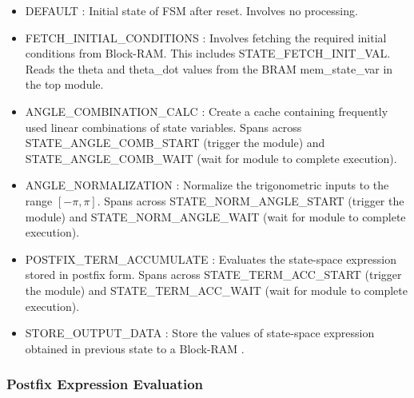 
\begin{itemize}
\item DEFAULT : Initial state of FSM after reset. Involves no processing.
\item FETCH\_INITIAL\_CONDITIONS : Involves fetching the required initial conditions from Block-RAM. This includes STATE\_FETCH\_INIT\_VAL. Reads the theta and theta\_dot values from the BRAM mem\_state\_var in the top module.
\item ANGLE\_COMBINATION\_CALC : Create a cache containing frequently used linear combinations of state variables. Spans across STATE\_ANGLE\_COMB\_START (trigger the module) and STATE\_ANGLE\_COMB\_WAIT (wait for module to complete execution).
\item ANGLE\_NORMALIZATION : Normalize the trigonometric inputs to the range $[-\pi, \pi]$. Spans across STATE\_NORM\_ANGLE\_START (trigger the module) and STATE\_NORM\_ANGLE\_WAIT (wait for module to complete execution).
\item POSTFIX\_TERM\_ACCUMULATE : Evaluates the state-space expression stored in postfix form. Spans across STATE\_TERM\_ACC\_START (trigger the module) and STATE\_TERM\_ACC\_WAIT (wait for module to complete execution).
\item STORE\_OUTPUT\_DATA : Store the values of state-space expression obtained in previous state to a Block-RAM .
\end{itemize}

\subsubsection{Postfix Expression Evaluation}

